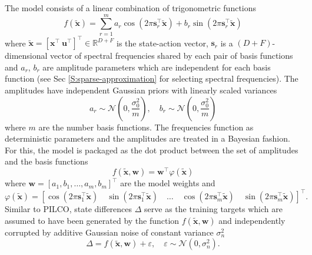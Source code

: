 The model consists of a linear combination of trigonometric functions \cite{quia2010sparse}
\begin{equation}
    f(\tilde{\mathbf{x}})=\sum_{r=1}^{m} a_{r} \cos \left(2 \pi \mathbf{s}_{r}^{\top} \tilde{\mathbf{x}}\right)+b_{r} \sin \left(2 \pi \mathbf{s}_{r}^{\top} \tilde{\mathbf{x}}\right)
    \label{Eq:Model-trigonometric-model}
\end{equation}
where $\tilde{\mathbf{x}}=\left[\mathbf{x}^{\top} \ \mathbf{u}^{\top}\right]^{\top}\in\mathbb{R}^{D+F}$ is the state-action vector, $\mathbf{s}_{r}$ is a $(D+F)$-dimensional vector of spectral frequencies shared by each pair of basis functions and $a_{r}$, $b_{r}$ are amplitude parameters which are independent for each basis function (see Sec \ref{S:sparse-approximation} for selecting spectral frequencies). The amplitudes have independent Gaussian priors with linearly scaled variances 
\begin{equation}
    a_{r} \sim \mathcal{N}\left(0, \frac{\sigma_{0}^{2}}{m}\right), \quad b_{r} \sim \mathcal{N}\left(0, \frac{\sigma_{0}^{2}}{m}\right)
\end{equation}
where $m$ are the number basis functions. The frequencies function as deterministic parameters and the amplitudes are treated in a Bayesian fashion. For this, the model is packaged as the dot product between the set of amplitudes and the basis functions 
\begin{equation}
    f(\tilde{\mathbf{x}}, \mathbf{w}) = \mathbf{w}^{\top} \varphi\left(\tilde{\mathbf{x}}\right)
\end{equation}
where $\mathbf{w}=\left[a_{1}, b_{1}, \dots, a_{m}, b_{m}\right]^{\top}$ are the model weights and
\begin{equation}
    \varphi(\tilde{\mathbf{x}})=\left[\cos \left(2 \pi \mathbf{s}_{1}^{\top} \tilde{\mathbf{x}}\right)\quad \sin \left(2 \pi \mathbf{s}_{1}^{\top} \tilde{\mathbf{x}}\right) \quad\ldots\quad \cos \left(2 \pi \mathbf{s}_{m}^{\top} \tilde{\mathbf{x}}\right) \quad \sin \left(2 \pi \mathbf{s}_{m}^{\top} \tilde{\mathbf{x}}\right)\right]^{\top}.
\end{equation}
Similar to PILCO, state differences $\Delta$ serve as the training targets which are assumed to have been generated by the function $f(\tilde{\mathbf{x}}, \mathbf{w})$ and independently corrupted by additive Gaussian noise of constant variance $\sigma_{n}^{2}$
\begin{equation}
    \Delta = f(\tilde{\mathbf{x}}, \mathbf{w}) + \varepsilon, \quad \varepsilon \sim \mathcal{N}\left(0,\sigma_{n}^{2}\right).
\end{equation}
